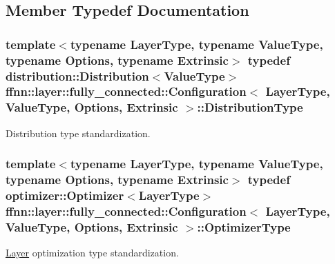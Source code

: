 \subsection{Member Typedef Documentation}
\hypertarget{classffnn_1_1layer_1_1fully__connected_1_1_configuration_a898b9f9b53bccc645867242b7fa163e9}{
\subsubsection[{Distribution\-Type}]{\setlength{\rightskip}{0pt plus 5cm}template$<$typename Layer\-Type, typename Value\-Type, typename Options, typename Extrinsic$>$ typedef {\bf distribution\-::\-Distribution}$<$Value\-Type$>$ {\bf ffnn\-::layer\-::fully\-\_\-connected\-::\-Configuration}$<$ {\bf Layer\-Type}, Value\-Type, Options, Extrinsic $>$\-::{\bf Distribution\-Type}}}\label{classffnn_1_1layer_1_1fully__connected_1_1_configuration_a898b9f9b53bccc645867242b7fa163e9}


Distribution type standardization. 

\hypertarget{classffnn_1_1layer_1_1fully__connected_1_1_configuration_ab1936b042b4c8a89da3031e2d5e767e4}{
\subsubsection[{Optimizer\-Type}]{\setlength{\rightskip}{0pt plus 5cm}template$<$typename Layer\-Type, typename Value\-Type, typename Options, typename Extrinsic$>$ typedef {\bf optimizer\-::\-Optimizer}$<${\bf Layer\-Type}$>$ {\bf ffnn\-::layer\-::fully\-\_\-connected\-::\-Configuration}$<$ {\bf Layer\-Type}, Value\-Type, Options, Extrinsic $>$\-::{\bf Optimizer\-Type}}}\label{classffnn_1_1layer_1_1fully__connected_1_1_configuration_ab1936b042b4c8a89da3031e2d5e767e4}


\hyperlink{classffnn_1_1layer_1_1_layer}{Layer} optimization type standardization. 

